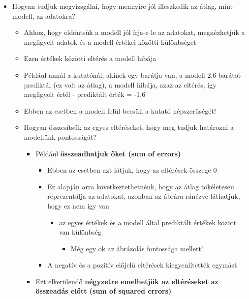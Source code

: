 \documentclass[
  letterpaper,
  DIV=11,
  numbers=noendperiod]{scrreprt}
\providecommand{\tightlist}{%
  \setlength{\itemsep}{0pt}\setlength{\parskip}{0pt}}\usepackage{longtable,booktabs,array}
\begin{document}
\begin{itemize}
\item
  Hogyan tudjuk megvizsgálni, hogy mennyire jól illeszkedik az átlag,
  mint modell, az adatokra?

  \begin{itemize}
  \item
    Ahhoz, hogy eldöntsük a modell jól írja-e le az adatokat,
    megnézhetjük a megfigyelt adatok és a modell értékei közötti
    különbséget
  \item
    Ezen értékek közötti eltérés a modell hibája
  \item
    Például annál a kutatónál, akinek egy barátja van, a modell 2.6
    barátot prediktál (ez volt az átlag), a modell hibája, azaz az
    eltérés, így megfigyelt értél - prediktált érték = -1.6
  \item
    Ebben az esetben a modell felül becsüli a kutató népszerűségét!
  \item
    Hogyan összesítsük az egyes eltéréseket, hogy meg tudjuk határozni a
    modellünk pontosságát?

    \begin{itemize}
    \item
      Például \textbf{összeadhatjuk őket (sum of errors)}

      \begin{itemize}
      \item
        Ebben az esetben azt látjuk, hogy az eltérések összege 0
      \item
        Ez alapján arra következtethetnénk, hogy az átlag tökéletesen
        reprezentálja az adatokat, azonban az ábrára ránézve láthatjuk,
        hogy ez nem így van

        \begin{itemize}
        \item
          az egyes értékek és a modell által prediktált értékek között
          van különbség

          \begin{itemize}
          \tightlist
          \item
            Még egy ok az ábrázolás fontossága mellett!
          \end{itemize}
        \end{itemize}
      \item
        A negatív és a pozitív előjelű eltérések kiegyenlítették egymást
      \end{itemize}
    \item
      Ezt elkerülendő \textbf{négyzetre emelhetjük az eltéréseket az
      összeadás előtt (sum of squared errors)}


\end{itemize}
\end{itemize}
\end{itemize}
\end{document}
